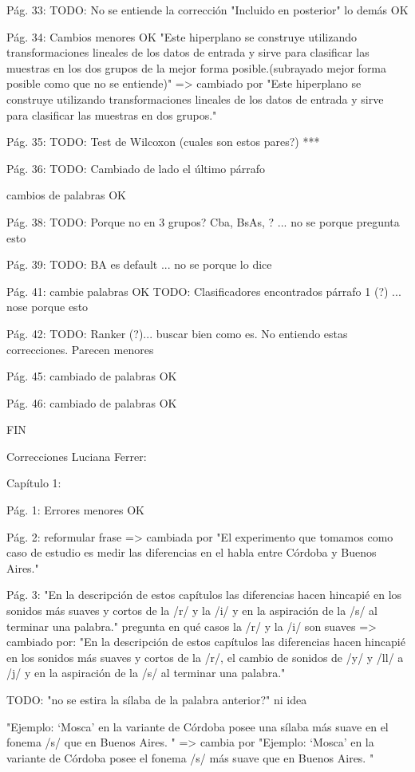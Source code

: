Pág. 33: 
TODO: No se entiende la corrección "Incluido en posterior"
lo demás OK

Pág. 34:
Cambios menores OK
"Este hiperplano se construye utilizando transformaciones lineales de los datos de entrada y sirve para clasificar las muestras en los dos grupos de la mejor forma posible.(subrayado mejor forma posible como que no se entiende)" => cambiado por 
"Este hiperplano se construye utilizando transformaciones lineales de los datos de entrada y sirve para clasificar las muestras en dos grupos."

Pág. 35:
TODO: Test de Wilcoxon (cuales son estos pares?) ***

Pág. 36:
TODO: Cambiado de lado el último párrafo 

cambios de palabras OK

Pág. 38: 
TODO: Porque no en 3 grupos? Cba, BsAs, ? ... no se porque pregunta esto

Pág. 39: 
TODO: BA es default ... no se porque lo dice

Pág. 41: cambie palabras OK
TODO: Clasificadores encontrados párrafo 1 (?) ... nose porque esto

Pág. 42: 
TODO: Ranker (?)... buscar bien como es.
No entiendo estas correcciones. Parecen menores

Pág. 45:
cambiado de palabras OK

Pág. 46:
cambiado de palabras OK

FIN

Correcciones Luciana Ferrer: 

Capítulo 1:

Pág. 1:
Errores menores OK

Pág. 2:
reformular frase => cambiada por "El experimento que tomamos como caso de estudio es medir las diferencias en el habla entre Córdoba y Buenos Aires."

Pág. 3:
"En la descripción de estos capítulos las diferencias hacen hincapié en los sonidos más suaves y cortos de la /r/ y la /i/ y en la aspiración de la /s/ al terminar una palabra." pregunta en qué casos la /r/ y la /i/ son suaves => cambiado por:
"En la descripción de estos capítulos las diferencias hacen hincapié en los sonidos más suaves y cortos de la /r/, el cambio de sonidos de /y/ y /ll/ a  /j/ y en la aspiración de la /s/ al terminar una palabra."

TODO: "no se estira la sílaba de la palabra anterior?" ni idea 

"Ejemplo: `Mosca' en la variante de Córdoba posee una sílaba más suave en el fonema /s/ que en Buenos Aires. " => cambia por
"Ejemplo: `Mosca' en la variante de Córdoba posee el fonema /s/ más suave que en Buenos Aires. "

